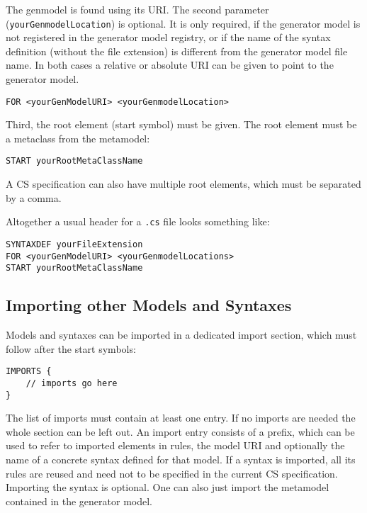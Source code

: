 The genmodel is found using its URI. The second parameter
(\texttt{yourGenmodelLocation}) is optional. It is only required, if the
generator model is not registered in the generator model registry, or if the
name of the syntax definition (without the file extension) is different from the
generator model file name. In both cases a relative or absolute URI can be given
to point to the generator model.
 
\begin{lstlisting}
FOR <yourGenModelURI> <yourGenmodelLocation>
\end{lstlisting}

Third, the root element (start symbol) must be given. The root element must be
a metaclass from the metamodel:

\begin{lstlisting}
START yourRootMetaClassName
\end{lstlisting}

A CS specification can also have multiple root elements, which must be separated
by a comma.

Altogether a usual header for a \texttt{.cs} file looks something like:

\begin{lstlisting}
SYNTAXDEF yourFileExtension
FOR <yourGenModelURI> <yourGenmodelLocations>
START yourRootMetaClassName
\end{lstlisting} 

\subsection{Importing other Models and Syntaxes}

Models and syntaxes can be imported in a dedicated import section, which must
follow after the start symbols:

\begin{lstlisting}
IMPORTS {
    // imports go here
}
\end{lstlisting}

The list of imports must contain at least one entry. If no imports are 
needed the whole section can be left out. An import entry consists of a prefix, 
which can be used to refer to imported elements in rules, the model URI and 
optionally the name of a concrete syntax defined for that model. If a syntax is 
imported, all its rules are reused and need not to be specified in the current 
CS specification. Importing the syntax is optional. One can also just import the
metamodel contained in the generator model.

